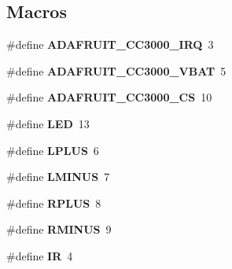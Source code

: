\subsection*{Macros}
\begin{DoxyCompactItemize}
\item 
\hypertarget{compressed_sensing_8ino_a5863bf16a0f6addecfd502856c2ba0f0}{\#define {\bfseries A\+D\+A\+F\+R\+U\+I\+T\+\_\+\+C\+C3000\+\_\+\+I\+R\+Q}~3}\label{compressed_sensing_8ino_a5863bf16a0f6addecfd502856c2ba0f0}

\item 
\hypertarget{compressed_sensing_8ino_aba6361788d09974072f6e1aec700c950}{\#define {\bfseries A\+D\+A\+F\+R\+U\+I\+T\+\_\+\+C\+C3000\+\_\+\+V\+B\+A\+T}~5}\label{compressed_sensing_8ino_aba6361788d09974072f6e1aec700c950}

\item 
\hypertarget{compressed_sensing_8ino_aa38deec1705654d8464b9c552c22e4d6}{\#define {\bfseries A\+D\+A\+F\+R\+U\+I\+T\+\_\+\+C\+C3000\+\_\+\+C\+S}~10}\label{compressed_sensing_8ino_aa38deec1705654d8464b9c552c22e4d6}

\item 
\hypertarget{compressed_sensing_8ino_aeb7a7ba1ab7e0406f1b5ab36d579f585}{\#define {\bfseries L\+E\+D}~13}\label{compressed_sensing_8ino_aeb7a7ba1ab7e0406f1b5ab36d579f585}

\item 
\hypertarget{compressed_sensing_8ino_a5c5d64ba8dc341fce64f0709022c6740}{\#define {\bfseries L\+P\+L\+U\+S}~6}\label{compressed_sensing_8ino_a5c5d64ba8dc341fce64f0709022c6740}

\item 
\hypertarget{compressed_sensing_8ino_aabf42ed37ab691c48a66105976e537e7}{\#define {\bfseries L\+M\+I\+N\+U\+S}~7}\label{compressed_sensing_8ino_aabf42ed37ab691c48a66105976e537e7}

\item 
\hypertarget{compressed_sensing_8ino_af7c81d02991640acf728457675ba7c72}{\#define {\bfseries R\+P\+L\+U\+S}~8}\label{compressed_sensing_8ino_af7c81d02991640acf728457675ba7c72}

\item 
\hypertarget{compressed_sensing_8ino_a2a74bc3cb529d74d1a3e862a1484c9b7}{\#define {\bfseries R\+M\+I\+N\+U\+S}~9}\label{compressed_sensing_8ino_a2a74bc3cb529d74d1a3e862a1484c9b7}

\item 
\hypertarget{compressed_sensing_8ino_a68e22635ff207d8ca10459833856bd75}{\#define {\bfseries I\+R}~4}\label{compressed_sensing_8ino_a68e22635ff207d8ca10459833856bd75}


\end{DoxyCompactItemize}
